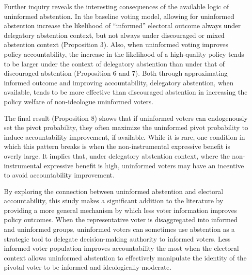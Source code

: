 \documentclass[letterpaper, 12pt]{article}
\begin{document}
    \par Further inquiry reveals the interesting consequences of the available logic of uninformed abstention. In the baseline voting model, allowing for uninformed abstention increase the likelihood of ``informed'' electoral outcome always under delegatory abstention context, but not always under discouraged or mixed abstention context (Proposition 3). Also, when uninformed voting improves policy accountability, the increase in the likelihood of a high-quality policy tends to be larger under the context of delegatory abstention than under that of discouraged abstention (Proposition 6 and 7). Both through approximating informed outcome and improving accountability, delegatory abstention, when available, tends to be more effective than discouraged abstention in increasing the policy welfare of non-ideologue uninformed voters.
    
    \par The final result (Proposition 8) shows that if uninformed voters can endogenously set the pivot probability, they often maximize the uninformed pivot probability to induce accountability improvement, if available. While it is rare, one condition in which this pattern breaks is when the non-instrumental expressive benefit is overly large. It implies that, under delegatory abstention context, where the non-instrumental expressive benefit is high, uninformed voters may have an incentive to avoid accountability improvement.  
    
    \par By exploring the connection between uninformed abstention and electoral accountability, this study makes a significant addition to the literature by providing a more general mechanism by which less voter information improves policy outcomes. When the representative voter is disaggregated into informed and uninformed groups, uninformed voters can sometimes use abstention as a strategic tool to delegate decision-making authority to informed voters. Less informed voter population improves accountability the most when the electoral context allows uninformed abstention to effectively manipulate the identity of the pivotal voter to be informed and ideologically-moderate. 
    
\end{document}

